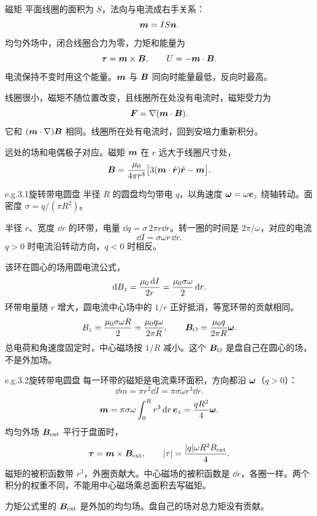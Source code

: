 \begin{frame}{磁矩}
平面线圈的面积为 $S$，法向与电流成右手关系：
\[
 \bm{m}=IS\bm{n}.
\]
均匀外场中，闭合线圈合力为零，力矩和能量为
\[
 \bm{\tau}=\bm{m}\times\bm{B},
 \qquad
 U=-\bm{m}\cdot\bm{B}.
\]
电流保持不变时用这个能量。$\bm{m}$ 与 $\bm{B}$ 同向时能量最低，反向时最高。

线圈很小，磁矩不随位置改变，且线圈所在处没有电流时，磁矩受力为
\[
 \bm{F}=\nabla(\bm{m}\cdot\bm{B}).
\]
它和 $(\bm{m}\cdot\nabla)\bm{B}$ 相同。线圈所在处有电流时，回到安培力重新积分。

远处的场和电偶极子对应。磁矩 $\bm{m}$ 在 $r$ 远大于线圈尺寸处，
\[
 \bm{B}=\frac{\mu_0}{4\pi r^3}\bigl[3(\bm{m}\cdot\hat{\bm{r}})\hat{\bm{r}}-\bm{m}\bigr].
\]
\end{frame}

\begin{frame}{e.g.3.1旋转带电圆盘}
半径 $R$ 的圆盘均匀带电 $q$，以角速度 $\bm{\omega}=\omega\bm{e}_z$ 绕轴转动。面密度 $\sigma=q/(\pi R^2)$。

半径 $r$、宽度 $\dd r$ 的环带，电量 $\dd q=\sigma\,2\pi r\dd r$。转一圈的时间是 $2\pi/\omega$，对应的电流
\[
 \dd I=\sigma\omega r\,\dd r.
\]
$q>0$ 时电流沿转动方向，$q<0$ 时相反。

该环在圆心的场用圆电流公式，
\[
 \mathop{}\!\mathrm d B_z=\frac{\mu_0\mathop{}\!\mathrm d I}{2r}=\frac{\mu_0\sigma\omega}{2}\mathop{}\!\mathrm d r.
\]
环带电量随 $r$ 增大，圆电流中心场中的 $1/r$ 正好抵消，等宽环带的贡献相同。
\[
 B_z=\frac{\mu_0\sigma\omega R}{2}=\frac{\mu_0 q\omega}{2\pi R},
 \qquad
 \bm{B}_O=\frac{\mu_0 q}{2\pi R}\bm{\omega}.
\]
总电荷和角速度固定时，中心磁场按 $1/R$ 减小。这个 $\bm{B}_O$ 是盘自己在圆心的场，不是外加场。
\end{frame}

\begin{frame}{e.g.3.2旋转带电圆盘}
每一环带的磁矩是电流乘环面积，方向都沿 $\bm{\omega}$（$q>0$）：
\[
 \dd m=\pi r^2\dd I=\pi\sigma\omega r^3\dd r.
\]
\[
 \bm{m}=\pi\sigma\omega\int_0^R r^3\mathop{}\!\mathrm d r\,\bm{e}_z
 =\frac{q R^2}{4}\bm{\omega}.
\]
均匀外场 $\bm{B}_{\rm ext}$ 平行于盘面时，
\[
 \bm{\tau}=\bm{m}\times\bm{B}_{\rm ext},
 \qquad
 |\tau|=\frac{|q|\omega R^2 B_{\rm ext}}{4}.
\]
磁矩的被积函数带 $r^3$，外圈贡献大。中心磁场的被积函数是 $\dd r$，各圈一样。两个积分的权重不同，不能用中心磁场乘总面积去写磁矩。

力矩公式里的 $\bm{B}_{\rm ext}$ 是外加的均匀场。盘自己的场对总力矩没有贡献。
\end{frame}

